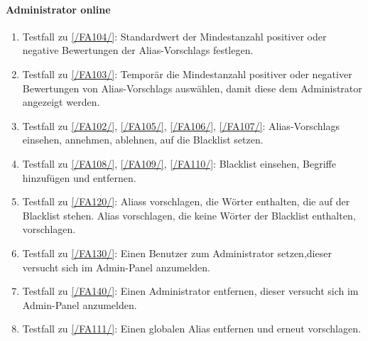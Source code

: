 \paragraph{\Gls{Administrator} online}
\begin{enumerate}[label=\textbf{/T\arabic*0/}, align=left, resume]
	\item \label{/T260/} Testfall zu \ref{/FA104/}: Standardwert der Mindestanzahl positiver oder negative Bewertungen der \Glspl{Alias-Vorschlag} festlegen.
	\item \label{/T270/} Testfall zu \ref{/FA103/}: Temporär die Mindestanzahl positiver oder negativer Bewertungen von \Glspl{Alias-Vorschlag} auswählen, damit diese dem \Gls{Administrator} angezeigt werden.
	\item \label{/T280/} Testfall zu \ref{/FA102/}, \ref{/FA105/}, \ref{/FA106/}, \ref{/FA107/}: \Glspl{Alias-Vorschlag} einsehen, annehmen, ablehnen, auf die \Gls{Blacklist} setzen.
	\item \label{/T290/} Testfall zu \ref{/FA108/}, \ref{/FA109/}, \ref{/FA110/}: \Gls{Blacklist} einsehen, Begriffe hinzufügen und entfernen.
	\item \label{/T291/} Testfall zu \ref{/FA120/}: \Glspl{Alias} vorschlagen, die Wörter enthalten, die auf der \Gls{Blacklist} stehen. \Gls{Alias} vorschlagen, die keine Wörter der \Gls{Blacklist} enthalten, vorschlagen.
	\item \label{/T292/} Testfall zu \ref{/FA130/}: Einen \Gls{Benutzer} zum \Gls{Administrator} setzen,dieser versucht sich im \Gls{Admin-Panel} anzumelden.
	\item \label{/T293/} Testfall zu \ref{/FA140/}: Einen \Gls{Administrator} entfernen, dieser versucht sich im \Gls{Admin-Panel} anzumelden.
	\item \label{/T294/} Testfall zu \ref{/FA111/}: Einen \gls{global}en \Gls{Alias} entfernen und erneut vorschlagen.
\end{enumerate}
